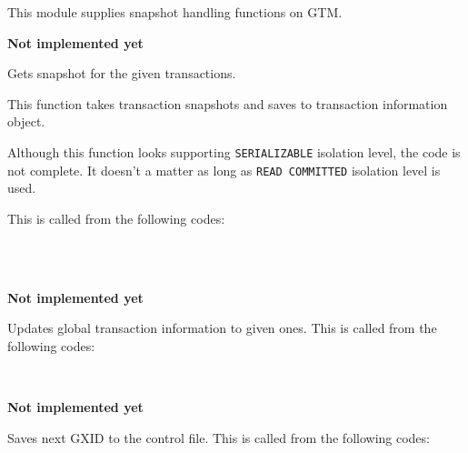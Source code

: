   This module supplies snapshot handling functions on GTM.
  
  
    \textbf{Not implemented yet}
  
  
    Gets snapshot for the given transactions.
    
    This function takes transaction snapshots and saves to transaction information object.
    
    Although this function looks supporting \texttt{SERIALIZABLE} isolation level, the code is not complete.
    It doesn't a matter as long as \texttt{READ COMMITTED} isolation level is used.
    
    This is called from the following codes:
    
    \FuncRefHdr
		\\
		\\ \hline
    \FuncRefTrailor
  
  
    \textbf{Not implemented yet}
  
  
    Updates global transaction information to given ones.
    This is called from the following codes:
    
    \FuncRefHdr
		\\ \hline
    \FuncRefTrailor
  
  
    \textbf{Not implemented yet}
  
  
  
    Saves next GXID to the control file.
    This is called from the following codes:
    
    \FuncRefHdr
		\\
		\\ \hline
    \FuncRefTrailor
  
